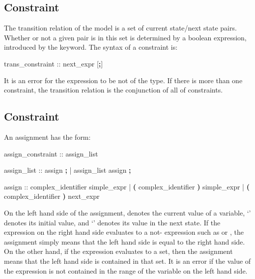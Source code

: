 \subsection{ Constraint}
\label{TRANS Constraint}
%
The transition relation of the model is a set of current state/next
state pairs.
%
Whether or not a given pair is in this set is determined by a boolean
expression, introduced by the  keyword.
%
The syntax of a  constraint is:
%
\begin{Grammar}
trans_constraint ::  next_expr [\textbf{;}]
\end{Grammar}
%
It is an error for the expression to be not of the \Boolean type.
%
If there is more than one  constraint, the transition
relation is the conjunction of all of  constraints.

\subsection{ Constraint}
\label{ASSIGN Constraint}
%
An assignment  has the form:
%
\begin{Grammar}
assign_constraint ::  assign_list

assign_list :: assign \textbf{;}
             | assign_list assign \textbf{;}

assign ::
    complex_identifier          \operator{:=} simple_expr
  |  \textbf{(} complex_identifier \textbf{)} \operator{:=} simple_expr
  |  \textbf{(} complex_identifier \textbf{)} \operator{:=} next_expr
\end{Grammar}
%
On the left hand side of the assignment,  denotes
the current value of a variable,
`{}' denotes its
initial value, and
`{}' denotes its
value in the next state.
%
If the expression on the right hand side evaluates to a not-\Set
expression such as  or , the assignment simply means that the left hand side is
equal to the right hand side.
%
On the other hand, if the expression evaluates to a set, then the
assignment means that the left hand side is contained in that set.
%
It is an error if the value of the expression is not contained in the
range of the variable on the left hand side.

